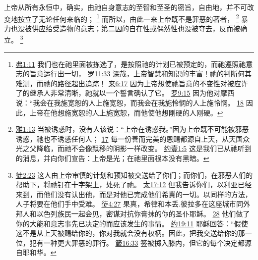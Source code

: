 \documentclass[12pt, a4paper, oneside]{ctexart}
\newcounter{parnum}[section]
\newcommand{\N}{%
   \noindent\refstepcounter{parnum}%
    \makebox[\parindent][l]{\textbf{\arabic{parnum}.}}}
\begin{document}
\N 上帝从所有永恒中，确实，由祂自身意志的至智和至圣的密旨，自由地，并不可改变地按立了无论任何来临的；
	\footnote {
		\href{https://biblehub.com/ephesians/1-11.htm}{弗1:11} 我们也在祂里面被拣选了，是按照祂的计划已被预定的，而祂遵照祂意志的旨意运行出一切，
		\href{https://biblehub.com/romans/11-33.htm}{罗11:33} 深哉，上帝智慧和知识的丰富！祂的判断何其难测，而祂的路径超出追踪！
		\href{https://biblehub.com/hebrews/6-17.htm}{来6:17} 因为上帝想使祂旨意的不变性对被应许了的继承人非常清晰，祂就以一个誓言确认了它。
		\href{https://biblehub.com/romans/9-15.htm}{罗9:15} 因为他对摩西说：“我会在我施宽恕的人上施宽恕，而我会在我施怜悯的人上施怜悯。
		\href{https://biblehub.com/romans/9-18.htm}{18} 因此，上帝在他想施宽恕的人上施宽恕，而他使他想刚硬的人刚硬。
	}
	而所以，由此一来上帝既不是罪恶的著者，
	\footnote {
		\href{https://biblehub.com/james/1-13.htm}{雅1:13} 当被诱惑时，没有人该说：“上帝在诱惑我。”因为上帝既不可能被邪恶诱惑，祂也不诱惑任何人；
		\href{https://biblehub.com/james/1-17.htm}{17} 每一份善而完美的恩赐都源自上天，从天国众光之父降临，而祂不会像飘移的阴影一样改变。
		\href{https://biblehub.com/1_john/1-5.htm}{约壹1:5} 这是我们已从祂听到的消息，并向你们宣告：上帝是光；在祂里面根本没有黑暗。
	}
	暴力也没被供应给受造物的意志；第二因的自在性或偶然性也没被夺去，反而被确立。
	\footnote {
		\href{https://biblehub.com/acts/2-23.htm}{徒2:23} 这人由上帝审慎的计划和预知被交送给了你们；而你们，在邪恶人们的帮助下，将祂钉在十字架上，处死了祂。
		\href{https://biblehub.com/matthew/17-12.htm}{太17:12} 但我告诉你们，以利亚已经来到，而他们没有认出他，而是对他已完成他们希冀的一切。以同样的方法，人子将要在他们手中受难。
		\href{https://biblehub.com/acts/4-27.htm}{徒4:27} 果真，希律和本丢.彼拉多在这座城市同外邦人和以色列族民一起会见，密谋对抗你膏抹的你的圣仆耶稣。
		\href{https://biblehub.com/acts/4-28.htm}{28} 他们做了你的大能和意志事先已决定的而应该发生的事情。
		\href{https://biblehub.com/john/19-11.htm}{约19:11} 耶稣回答：“假使这不是从上天被赐给你的，你对我就会没有权柄。因此，把我交送给你的那一位，犯有一种更大罪恶的罪行。
		\href{https://biblehub.com/proverbs/16-33.htm}{箴16:33} 签被掷入膝内，但它的每个决定都源自耶和华。
	}
\end{document}
